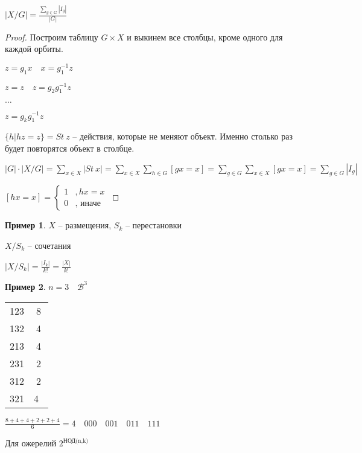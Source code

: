 \documentclass{book}
\theoremstyle{definition}
\newtheorem*{example}{Пример}
\newcommand{\incfig}[1]{%
    \def\svgwidth{\columnwidth}
    {#1.pdf_tex}
}
\begin{document}
\begin{theorem}
    $\left| X / G \right|  = \frac{\sum_{g\in G} \left| I_g \right| }{|G|}$
\end{theorem}
\begin{proof}

Построим таблицу $G\times X$ и выкинем все столбцы, кроме одного для каждой орбиты. 

$z=g_1x\quad x=g_1^{-1}z$

$z = z\quad z=g_2g_1^{-1}z$

$\ldots$

$z = g_kg_1^{-1}z$

$\{h|hz=z\} = St~z$ -- действия, которые не меняют объект. Именно столько раз будет повторятся объект в столбце. 

$|G|\cdot \left| X / G \right|  = \sum_{x\in X} \left| St~x \right| = \sum_{x\in X}\sum_{h\in G}[gx=x] = \sum_{g\in G}\sum_{x\in X}[gx=x] = \sum_{g\in G}|I_g| $ 

$[hx=x] = \begin{cases}
    1&,hx=x\\
    0&, \text{ иначе}
\end{cases}$ 

\end{proof}

\begin{example}
    $X$ -- размещения,  $S_k$ -- перестановки

     $X / S_k$ -- сочетания

      $\left| X / S_k \right|  = \frac{|I_k|}{k!} = \frac{|X|}{k!}$
\end{example}

\begin{example}
    $n=3\quad \mathscr{B}^3$ 

    \begin{tabular}{c|c}
        123&8\\
        132&4\\
        213&4\\
        231&2\\
        312&2\\
        321&4\
        
    \end{tabular}

    $\frac{8+4+4+2+2+4}{6} = 4\quad 000\quad 001\quad 011\quad 111 $
\end{example}

Для ожерелий $2^{\text{НОД(n,k)}}$
  
\end{document}

